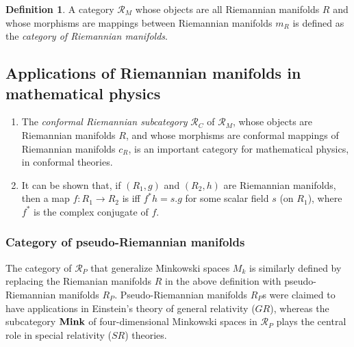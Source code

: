\documentclass[12pt]{article}
\theoremstyle{plain}
\theoremstyle{definition}
\newtheorem{definition}{Definition}[section]
\numberwithin{equation}{section}
\begin{document}
\begin{definition}
A category $\mathcal{R}_M$ whose objects are all Riemannian manifolds $R$ and whose morphisms are mappings between Riemannian manifolds $m_R$ is defined as the {\em category of Riemannian manifolds}.
\end{definition}

\subsection{Applications of Riemannian manifolds in mathematical physics}

\begin{enumerate}
\item The {\em conformal Riemannian subcategory} $\mathcal{R}_C$ of $\mathcal{R}_M$, whose objects are Riemannian manifolds $R$, and whose morphisms are conformal mappings of Riemannian manifolds $c_R$, is an important category for mathematical physics, in conformal theories. 

\item It can be shown that, if $(R_1,g)$ and $(R_2,h)$ are Riemannian manifolds, then 
a map $f \colon R_1 \to R_2$ is  iff $f^* h = s.g$ for some scalar field $s$ 
(on $R_1$), where $f^*$ is the complex conjugate of $f$.

\end{enumerate}


\subsubsection{Category of pseudo-Riemannian manifolds}

 The category of  $\mathcal{R}_P$ that generalize Minkowski spaces $M_k$ is similarly defined by replacing the Riemanian manifolds $R$ in the above definition with pseudo-Riemannian manifolds $R_P$. Pseudo-Riemannian manifolds $R_P$s were claimed to have applications in Einstein's theory of general relativity ($GR$), whereas the subcategory ${\bf Mink}$ of four-dimensional Minkowski spaces in $\mathcal{R}_P$ plays the central role in special relativity ($SR$) theories.  



\end{document}
